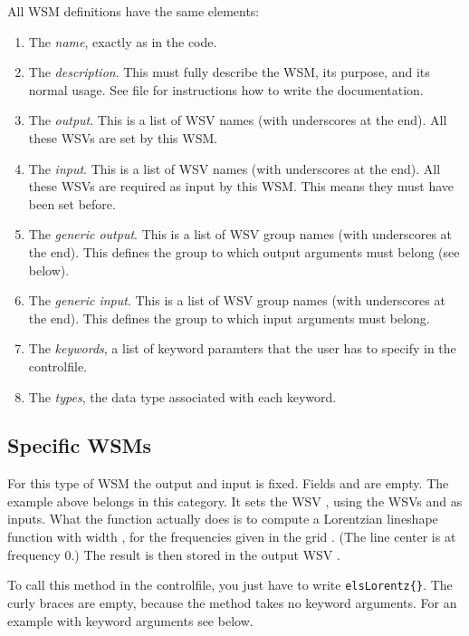 \noindent
All WSM definitions have the same elements:
\begin{enumerate}
\item The \emph{name}, exactly as in the code.
\item The \emph{description}. This must fully describe the WSM, its
  purpose, and its normal usage. See file  for
  instructions how to write the documentation.
\item The \emph{output}. This is a list of WSV names (with underscores
  at the end). All these WSVs are set by this WSM.
\item The \emph{input}. This is a list of WSV names (with underscores
  at the end). All these WSVs are required as input by this WSM. This
  means they must have been set before.
\item The \emph{generic output}. This is a list of WSV group names (with underscores
  at the end). This defines the group to which output arguments must
  belong (see below).
\item The \emph{generic input}. This is a list of WSV group names (with underscores
  at the end). This defines the group to which input arguments must
  belong.
\item The \emph{keywords}, a list of keyword paramters that the user
  has to specify in the controlfile.
\item The \emph{types}, the data type associated with each keyword.
\end{enumerate}

\subsection{Specific WSMs}

For this type of WSM the output and input is fixed. Fields
 and  are empty. The example
above belongs in this category. It sets the WSV , using
the WSVs  and  as
inputs. What the function actually does is to compute a Lorentzian
lineshape function with width , for the
frequencies given in the grid . (The line center
is at frequency 0.) The result is then stored in the output WSV
. 

To call this method in the controlfile, you just have to write
\verb|elsLorentz{}|. 
The curly braces are empty, because the
method takes no keyword arguments. For an example with keyword
arguments see below.

